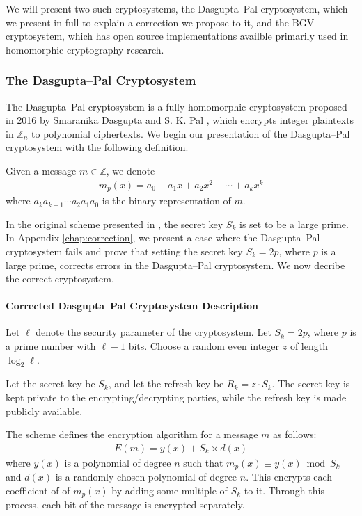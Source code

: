 We will present two such cryptosystems, the Dasgupta--Pal cryptosystem, which we present in full to explain a correction we propose to it, and the BGV cryptosystem, which has open source implementations availble primarily used in homomorphic cryptography research.

\subsubsection{The Dasgupta--Pal Cryptosystem}
The Dasgupta--Pal cryptosystem is a fully homomorphic cryptosystem proposed in 2016 by Smaranika Dasgupta and S. K. Pal \cite{dasgupta_design_2016}, which encrypts integer plaintexts in $\mathbb{Z}_n$ to polynomial ciphertexts. We begin our presentation of the Dasgupta--Pal cryptosystem with the following definition.

Given a message $m \in \mathbb{Z}$, we denote
\begin{align*}
		m_p(x) = a_0 + a_1 x + a_2 x^2 + \cdots + a_k x^k
\end{align*}
where $a_k a_{k-1}\cdots a_2 a_1 a_0$ is the binary representation of $m$.

In the original scheme presented in \cite{dasgupta_design_2016}, the secret key $S_k$ is set to be a large prime. In Appendix \ref{chap:correction}, we present a case where the Dasgupta--Pal cryptosystem fails and prove that setting the secret key $S_k = 2p$, where $p$ is a large prime, corrects errors in the Dasgupta--Pal cryptosystem.
We now decribe the correct cryptosystem.
\paragraph{Corrected Dasgupta--Pal Cryptosystem Description}
Let $\ell$ denote the security parameter of the cryptosystem.
Let $S_k = 2p$, where $p$ is a prime number with $\ell - 1$ bits.
Choose a random even integer $z$ of length $\log_2{\ell}$.

Let the secret key be $S_k$, and let the refresh key be $R_k = z \cdot S_k$. The secret key is kept private to the encrypting/decrypting parties, while the refresh key is made publicly available.

The scheme defines the encryption algorithm for a message $m$ as follows:
\begin{align*}
	E(m) = y(x) + S_k\times d(x)
\end{align*}
where
$y(x)$ is a polynomial of degree $n$ such that $m_p(x) \equiv y(x) \bmod S_k$ and $d(x)$ is a randomly chosen polynomial of degree $n$. This encrypts each coefficient of of $m_p(x)$ by adding some multiple of $S_k$ to it. Through this process, each bit of the message is encrypted separately.

